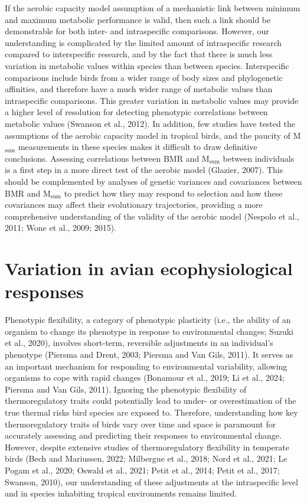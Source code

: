 \documentclass[10pt, twoside]{book} %
\begin{document}
If the aerobic capacity model assumption of a mechanistic link between minimum and maximum metabolic performance is valid, then such a link should be demonstrable for both inter- and intraspecific comparisons. However, our understanding is complicated by the limited amount of intraspecific research compared to interspecific research, and by the fact that there is much less variation in metabolic values within species than between species. Interspecific comparisons include birds from a wider range of body sizes and phylogenetic affinities, and therefore have a much wider range of metabolic values than intraspecific comparisons. This greater variation in metabolic values may provide a higher level of resolution for detecting phenotypic correlations between metabolic values (Swanson et al., 2012). In addition, few studies have tested the assumptions of the aerobic capacity model in tropical birds, and the paucity of M$_{\text{sum}}$ measurements in these species makes it difficult to draw definitive conclusions. Assessing correlations between BMR and M$_{\text{sum}}$ between individuals is a first step in a more direct test of the aerobic model (Glazier, 2007). This should be complemented by analyses of genetic variances and covariances between BMR and M$_{\text{sum}}$ to predict how they may respond to selection and how these covariances may affect their evolutionary trajectories, providing a more comprehensive understanding of the validity of the aerobic model (Nespolo et al., 2011; Wone et al., 2009; 2015).\\

\section{Variation in avian ecophysiological responses}

\noindent Phenotypic flexibility, a category of phenotypic plasticity (i.e., the ability of an organism to change its phenotype in response to environmental changes; Suzuki et al., 2020), involves short-term, reversible adjustments in an individual's phenotype (Piersma and Drent, 2003; Piersma and Van Gils, 2011). It serves as an important mechanism for responding to environmental variability, allowing organisms to cope with rapid changes (Bonamour et al., 2019; Li et al., 2024; Piersma and Van Gils, 2011). Ignoring the phenotypic flexibility of thermoregulatory traits could potentially lead to under- or overestimation of the true thermal risks bird species are exposed to. Therefore, understanding how key thermoregulatory traits of birds vary over time and space is paramount for accurately assessing and predicting their responses to environmental change. However, despite extensive studies of thermoregulatory flexibility in temperate birds (Bech and Mariussen, 2022; Milbergue et al., 2018; Nord et al., 2021; Le Pogam et al., 2020; Oswald et al., 2021; Petit et al., 2014; Petit et al., 2017; Swanson, 2010), our understanding of these adjustments at the intraspecific level and in species inhabiting tropical environments remains limited.\\
\end{document}
